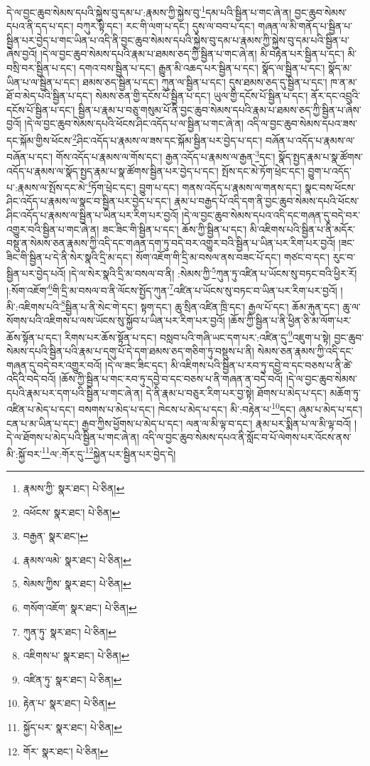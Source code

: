 དེ་ལ་བྱང་ཆུབ་སེམས་དཔའི་སྐྱེས་བུ་དམ་པ་:རྣམས་ཀྱི་སྐྱེས་བུ་\footnote{རྣམས་ཀྱི་  སྣར་ཐང་།  པེ་ཅིན། }དམ་པའི་སྦྱིན་པ་གང་ཞེ་ན། བྱང་ཆུབ་སེམས་དཔའ་ནི་དད་པ་དང་། བཀུར་སྟི་དང་། རང་གི་ལག་པ་དང་། དུས་ལ་བབ་པ་དང་། གཞན་ལ་མི་གནོད་པ་སྦྱིན་པ་སྦྱིན་པར་བྱེད་པ་གང་ཡིན་པ་འདི་ནི་བྱང་ཆུབ་སེམས་དཔའི་སྐྱེས་བུ་དམ་པ་རྣམས་ཀྱི་སྐྱེས་བུ་དམ་པའི་སྦྱིན་པ་ཞེས་བྱའོ། །དེ་ལ་བྱང་ཆུབ་སེམས་དཔའི་རྣམ་པ་ཐམས་ཅད་ཀྱི་སྦྱིན་པ་གང་ཞེ་ན། མི་བརྟེན་པར་སྦྱིན་པ་དང་། མི་བསྲི་བར་སྦྱིན་པ་དང་། དགའ་བས་སྦྱིན་པ་དང་། རྒྱུན་མི་འཆད་པར་སྦྱིན་པ་དང་། སྣོད་ལ་སྦྱིན་པ་དང་། སྣོད་མ་ཡིན་པ་ལ་སྦྱིན་པ་དང་། ཐམས་ཅད་སྦྱིན་པ་དང་། ཀུན་ལ་སྦྱིན་པ་དང་། དུས་ཐམས་ཅད་དུ་སྦྱིན་པ་དང་། ཁ་ན་མ་ཐོ་བ་མེད་པའི་སྦྱིན་པ་དང་། སེམས་ཅན་གྱི་དངོས་པོ་སྦྱིན་པ་དང་། ཡུལ་གྱི་དངོས་པོ་སྦྱིན་པ་དང་། ནོར་དང་འབྲུའི་དངོས་པོ་སྦྱིན་པ་དང་། སྦྱིན་པ་རྣམ་པ་བཅུ་གསུམ་པོ་ནི་བྱང་ཆུབ་སེམས་དཔའི་རྣམ་པ་ཐམས་ཅད་ཀྱི་སྦྱིན་པ་ཞེས་བྱའོ། །དེ་ལ་བྱང་ཆུབ་སེམས་དཔའི་ཕོངས་ཤིང་འདོད་པ་ལ་སྦྱིན་པ་གང་ཞེ་ན། འདི་ལ་བྱང་ཆུབ་སེམས་དཔའ་ཟས་དང་སྐོམ་གྱིས་ཕོངས་\footnote{འཕོངས་  སྣར་ཐང་།  པེ་ཅིན། }ཤིང་འདོད་པ་རྣམས་ལ་ཟས་དང་སྐོམ་སྦྱིན་པར་བྱེད་པ་དང་། བཞོན་པ་འདོད་པ་རྣམས་ལ་བཞོན་པ་དང་། གོས་འདོད་པ་རྣམས་ལ་གོས་དང་། རྒྱན་འདོད་པ་རྣམས་ལ་རྒྱན་\footnote{བརྒྱན་  སྣར་ཐང་། }དང་། སྣོད་སྤྱད་རྣམ་པ་སྣ་ཚོགས་འདོད་པ་རྣམས་ལ་སྣོད་སྤྱད་རྣམ་པ་སྣ་ཚོགས་སྦྱིན་པར་བྱེད་པ་དང་། སྤོས་དང་མེ་ཏོག་ཕྲེང་དང་། བྱུག་པ་འདོད་པ་:རྣམས་ལ་སྤོས་དང་མེ་\footnote{རྣམས་ལམེ་  སྣར་ཐང་།  པེ་ཅིན། }ཏོག་ཕྲེང་དང་། བྱུག་པ་དང་། གནས་འདོད་པ་རྣམས་ལ་གནས་དང་། སྣང་བས་ཕོངས་ཤིང་འདོད་པ་རྣམས་ལ་སྣང་བ་སྦྱིན་པར་བྱེད་པ་དང་། རྣམ་པ་བརྒྱད་པོ་འདི་དག་ནི་བྱང་ཆུབ་སེམས་དཔའི་ཕོངས་ཤིང་འདོད་པ་རྣམས་ལ་སྦྱིན་པ་ཡིན་པར་རིག་པར་བྱའོ། །དེ་ལ་བྱང་ཆུབ་སེམས་དཔའ་འདི་དང་གཞན་དུ་བདེ་བར་འགྱུར་བའི་སྦྱིན་པ་གང་ཞེ་ན། ཟང་ཟིང་གི་སྦྱིན་པ་དང་། ཆོས་ཀྱི་སྦྱིན་པ་དང་། མི་འཇིགས་པའི་སྦྱིན་པ་ནི་མདོར་བསྡུ་ན་སེམས་ཅན་རྣམས་ཀྱི་འདི་དང་གཞན་དག་ཏུ་བདེ་བར་འགྱུར་བའི་སྦྱིན་པ་ཡིན་པར་རིག་པར་བྱའོ། །ཟང་ཟིང་གི་སྦྱིན་པ་དེ་ནི་སེར་སྣའི་དྲི་མ་དང་། སོག་འཇོག་གི་དྲི་མ་བསལ་ནས་བཟང་པོ་དང་། གཙང་བ་དང་། རུང་བ་སྦྱིན་པར་བྱེད་པའོ། །དེ་ལ་སེར་སྣའི་དྲི་མ་བསལ་བ་ནི། :སེམས་ཀྱི་\footnote{སེམས་ཀྱིས་  སྣར་ཐང་།  པེ་ཅིན། }ཀུན་ཏུ་འཛིན་པ་ཡོངས་སུ་བཏང་བའི་ཕྱིར་རོ། །:སོག་འཇོག་\footnote{གསོག་འཇོག་  སྣར་ཐང་།  པེ་ཅིན། }གི་དྲི་མ་བསལ་བ་ནི་ལོངས་སྤྱོད་ཀུན་\footnote{ཀུན་ཏུ་  སྣར་ཐང་།  པེ་ཅིན། }འཛིན་པ་ཡོངས་སུ་བཏང་བ་ཡིན་པར་རིག་པར་བྱའོ། །མི་:འཇིགས་པའི་\footnote{འཇིགས་པ་  སྣར་ཐང་།  པེ་ཅིན། }སྦྱིན་པ་ནི་སེང་གེ་དང་། སྟག་དང་། ཆུ་སྲིན་འཛིན་ཁྲི་དང་། རྒྱལ་པོ་དང་། ཆོམ་རྐུན་དང་། ཆུ་ལ་སོགས་པའི་འཇིགས་པ་ལས་ཡོངས་སུ་སྐྱོབ་པ་ཡིན་པར་རིག་པར་བྱའོ། །ཆོས་ཀྱི་སྦྱིན་པ་ནི་ཕྱིན་ཅི་མ་ལོག་པར་ཆོས་སྟོན་པ་དང་། རིགས་པར་ཆོས་སྟོན་པ་དང་། བསླབ་པའི་གཞི་ཡང་དག་པར་:འཛིན་དུ་\footnote{འཛིན་ཏུ་  སྣར་ཐང་།  པེ་ཅིན། }འཇུག་པ་སྟེ། བྱང་ཆུབ་སེམས་དཔའི་སྦྱིན་པའི་རྣམ་པ་དགུ་པོ་དེ་དག་ཐམས་ཅད་གཅིག་ཏུ་བསྡུས་པ་ནི། སེམས་ཅན་རྣམས་ཀྱི་འདི་དང་གཞན་དུ་བདེ་བར་འགྱུར་བའོ། །དེ་ལ་ཟང་ཟིང་དང་། མི་འཇིགས་པའི་སྦྱིན་པ་རབ་ཏུ་དབྱེ་བ་དང་བཅས་པ་ནི་ཚེ་འདིའི་བདེ་བའོ། །ཆོས་ཀྱི་སྦྱིན་པ་གང་རབ་ཏུ་དབྱེ་བ་དང་བཅས་པ་ནི་གཞན་ན་བདེ་བའོ། །དེ་ལ་བྱང་ཆུབ་སེམས་དཔའི་རྣམ་པར་དག་པའི་སྦྱིན་པ་གང་ཞེ་ན། དེ་ནི་རྣམ་པ་བཅུར་རིག་པར་བྱ་སྟེ། ཐོགས་པ་མེད་པ་དང་། མཆོག་ཏུ་འཛིན་པ་མེད་པ་དང་། བསགས་པ་མེད་པ་དང་། ཁེངས་པ་མེད་པ་དང་། མི་:བརྟེན་པ་\footnote{རྟེན་པ་  སྣར་ཐང་།  པེ་ཅིན། }དང་། ཞུམ་པ་མེད་པ་དང་། ངན་པ་མ་ཡིན་པ་དང་། རྒྱབ་ཀྱིས་ཕྱོགས་པ་མེད་པ་དང་། ལན་ལ་མི་ལྟ་བ་དང་། རྣམ་པར་སྨིན་པ་ལ་མི་ལྟ་བའོ། །དེ་ལ་ཐོགས་པ་མེད་པའི་སྦྱིན་པ་གང་ཞེ་ན། འདི་ལ་བྱང་ཆུབ་སེམས་དཔའ་ནི་སློང་བ་པོ་ལེགས་པར་འོངས་ནས་མི་:སྐྱོ་བར་\footnote{སྐྱོད་པར་  སྣར་ཐང་།  པེ་ཅིན། }ལ་:གོར་དུ་\footnote{གོར་  སྣར་ཐང་།  པེ་ཅིན། }སྐྱེན་པར་སྦྱིན་པར་བྱེད་དེ། 